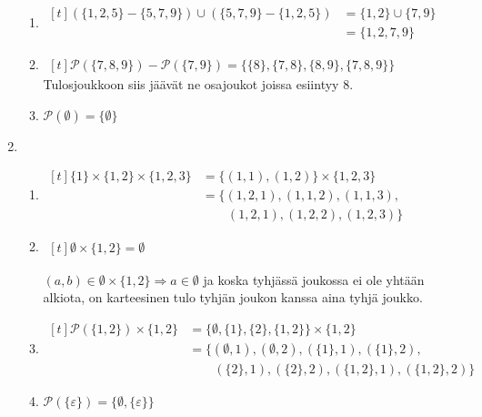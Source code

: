 \documentclass[a4paper,11pt,draft]{article}
\newenvironment{lalign}%
{\begin{math}\begin{aligned}[t]}%
{\end{aligned}\end{math}}
\begin{document}
\begin{enumerate}
\begin{enumerate}
  \item
    \begin{lalign}
      (\{1,2,5\} - \{5,7,9\}) \cup (\{5,7,9\} - \{1,2,5\})
      &= \{1,2\} \cup \{7,9\} \\
      &= \{1,2,7,9\}
    \end{lalign}

  \item
    \begin{lalign}
      \mathcal{P}(\{7,8,9\}) - \mathcal{P}(\{7,9\})
      = \{\{8\}, \{7,8\}, \{8,9\}, \{7,8,9\}\}
    \end{lalign}
    Tulosjoukkoon siis jäävät ne osajoukot joissa esiintyy 8.
  \item
    $\mathcal{P}(\emptyset) = \{\emptyset\}$
  \end{enumerate}

\item
  \begin{enumerate}
  \item
    \begin{lalign}
      \{1\} \times \{1,2\} \times \{1,2,3\}
      &= \{(1,1), (1,2)\} \times \{1,2,3\} \\
      &= \{(1,2,1), (1,1,2), (1,1,3),\\
      &\qquad(1,2,1), (1,2,2), (1,2,3)\}
    \end{lalign}

  \item
    \begin{lalign}
      \emptyset \times \{1,2\} = \emptyset
    \end{lalign}

    $(a,b) \in \emptyset \times \{1,2\} \Rightarrow a \in \emptyset$
    ja koska tyhjässä joukossa ei ole yhtään alkiota, on karteesinen
    tulo tyhjän joukon kanssa aina tyhjä joukko.

  \item
    \begin{lalign}
      \mathcal{P}(\{1,2\}) \times \{1,2\}
      &= \{\emptyset, \{1\}, \{2\}, \{1,2\}\} \times \{1,2\} \\
      &= \{(\emptyset, 1), (\emptyset, 2), (\{1\}, 1), (\{1\}, 2),\\
      &\qquad(\{2\}, 1), (\{2\}, 2), (\{1,2\}, 1), (\{1,2\}, 2)\}
    \end{lalign}

  \item
    $\mathcal{P}(\{\varepsilon\}) = \{\emptyset, \{\varepsilon\}\}$
  \end{enumerate}


\end{enumerate}
\end{document}
